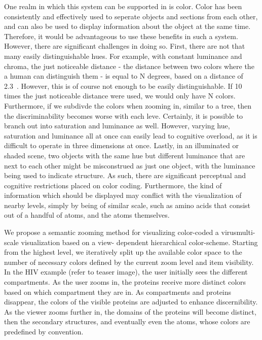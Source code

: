\documentclass[review,journal]{vgtc}         %
\begin{document}
One realm in which this system can be supported in is color. Color has been consistently and effectively used to seperate objects and sections from each other, and can also be used to display information about the object at the same time. 
Therefore, it would be advantageous to use these benefits in such a system. 
However, there are significant challenges in doing so. First, there are not that many easily distinguishable hues. 
For example, with constant luminance and chroma, the just noticeable distance - the distance between two colors where the a human can distinguish them - is equal to N degrees, based on a distance of 2.3~\cite{EvaluationColorSpaces}. However, this is of course not enough to be easily distinguishable. If 10 times the just noticeable distance were used, we would only have N colors. Furthermore, if we subdivde the colors when zooming in, similar to a tree, then the discriminability becomes worse with each leve. Certainly, it is possible to branch out into saturation and luminance as well. However, varying hue, saturation and luminance all at once can easily lead to cognitive overload, as it is difficult to operate in three dimensions at once. Lastly, in an illuminated or shaded scene, two objects with the same hue but different luminance that are next to each other might be misconstrued as just one object, with the luminance being used to indicate structure. As such, there are significant perceptual and cognitive restrictions placed on color coding. Furthermore, the kind of information which should be displayed may conflict with the visualization of nearby levels, simply by being of similar scale, such as amino acids that consist out of a handful of atoms, and the atoms themselves.



We propose a semantic zooming method for visualizing color-coded a virusmulti-scale visualization based on a view- dependent hierarchical color-scheme. Starting from the highest level, we iteratively split up the available color space to the number of necessary colors defined by the current zoom level and item visibility.
In the HIV example (refer to teaser image), the user initially sees the different compartments. 
As the user zooms in, the proteins receive more distinct colors based on which compartment they are in. As compartments and proteins disappear, the colors of the visible proteins are adjusted to enhance discernibility.  
As the viewer zooms further in, the domains of the proteins will become distinct, then the secondary structures, and eventually even the atoms, whose colors are predefined by convention. 
\end{document}
